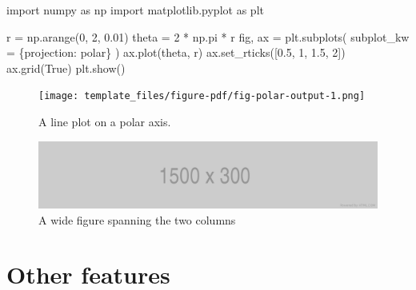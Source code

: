 \documentclass[letterpaper, 10 pt, journal, twoside]{IEEEtran}
\newenvironment{Shaded}{\begin{snugshade}}{\end{snugshade}}
\newcommand{\DecValTok}[1]{\textcolor[rgb]{0.68,0.00,0.00}{#1}}
\newcommand{\FloatTok}[1]{\textcolor[rgb]{0.68,0.00,0.00}{#1}}
\newcommand{\ImportTok}[1]{\textcolor[rgb]{0.00,0.46,0.62}{#1}}
\newcommand{\NormalTok}[1]{\textcolor[rgb]{0.00,0.23,0.31}{#1}}
\newcommand{\OperatorTok}[1]{\textcolor[rgb]{0.37,0.37,0.37}{#1}}
\newcommand{\StringTok}[1]{\textcolor[rgb]{0.13,0.47,0.30}{#1}}
\newcommand{\VariableTok}[1]{\textcolor[rgb]{0.07,0.07,0.07}{#1}}
\begin{document}
\begin{Shaded}
\begin{Highlighting}[]
\ImportTok{import}\NormalTok{ numpy }\ImportTok{as}\NormalTok{ np}
\ImportTok{import}\NormalTok{ matplotlib.pyplot }\ImportTok{as}\NormalTok{ plt}

\NormalTok{r }\OperatorTok{=}\NormalTok{ np.arange(}\DecValTok{0}\NormalTok{, }\DecValTok{2}\NormalTok{, }\FloatTok{0.01}\NormalTok{)}
\NormalTok{theta }\OperatorTok{=} \DecValTok{2} \OperatorTok{*}\NormalTok{ np.pi }\OperatorTok{*}\NormalTok{ r}
\NormalTok{fig, ax }\OperatorTok{=}\NormalTok{ plt.subplots(}
\NormalTok{  subplot\_kw }\OperatorTok{=}\NormalTok{ \{}\StringTok{\textquotesingle{}projection\textquotesingle{}}\NormalTok{: }\StringTok{\textquotesingle{}polar\textquotesingle{}}\NormalTok{\} }
\NormalTok{)}
\NormalTok{ax.plot(theta, r)}
\NormalTok{ax.set\_rticks([}\FloatTok{0.5}\NormalTok{, }\DecValTok{1}\NormalTok{, }\FloatTok{1.5}\NormalTok{, }\DecValTok{2}\NormalTok{])}
\NormalTok{ax.grid(}\VariableTok{True}\NormalTok{)}
\NormalTok{plt.show()}
\end{Highlighting}
\end{Shaded}

\begin{figure}[H]

{\centering \texttt{[image: template\_files/figure-pdf/fig-polar-output-1.png]}

}

\caption{\label{fig-polar}A line plot on a polar axis.}

\end{figure}

\begin{figure}

{\centering \includegraphics{fig-wide.png}

}

\caption{\label{fig-wide}A wide figure spanning the two columns}

\end{figure}

\hypertarget{sec-feature}{%
\section{Other features}\label{sec-feature}}
\end{document}
